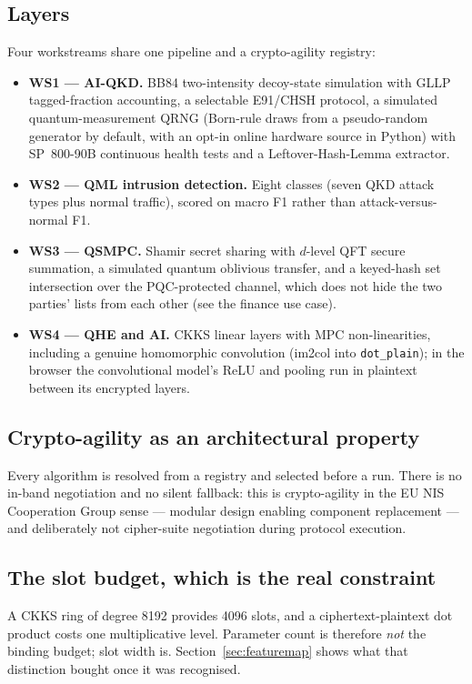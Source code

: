 \documentclass[11pt,a4paper]{article}
\begin{document}
\subsection{Layers}
Four workstreams share one pipeline and a crypto-agility registry:
\begin{itemize}
  \item \textbf{WS1 --- AI-QKD.} BB84 two-intensity decoy-state simulation with GLLP tagged-fraction
        accounting, a selectable E91/CHSH protocol, a simulated quantum-measurement QRNG
        (Born-rule draws from a pseudo-random generator by default, with an opt-in online hardware
        source in Python) with SP~800-90B continuous health tests and a Leftover-Hash-Lemma
        extractor.
  \item \textbf{WS2 --- QML intrusion detection.} Eight classes (seven QKD attack types plus normal
        traffic), scored on macro F1 rather than attack-versus-normal F1.
  \item \textbf{WS3 --- QSMPC.} Shamir secret sharing with $d$-level QFT secure summation, a
        simulated quantum oblivious transfer, and a keyed-hash set intersection over the
        PQC-protected channel, which does not hide the two parties' lists from each other (see the
        finance use case).
  \item \textbf{WS4 --- QHE and AI.} CKKS linear layers with MPC non-linearities, including a genuine
        homomorphic convolution (im2col into \texttt{dot\_plain}); in the browser the convolutional
        model's ReLU and pooling run in plaintext between its encrypted layers.
\end{itemize}

\subsection{Crypto-agility as an architectural property}
Every algorithm is resolved from a registry and selected before a run. There is no in-band
negotiation and no silent fallback: this is crypto-agility in the EU NIS Cooperation Group sense ---
modular design enabling component replacement --- and deliberately not cipher-suite negotiation
during protocol execution.



\subsection{The slot budget, which is the real constraint}
A CKKS ring of degree 8192 provides 4096 slots, and a ciphertext-plaintext dot product costs one
multiplicative level. Parameter count is therefore \emph{not} the binding budget; slot width is.
Section~\ref{sec:featuremap} shows what that distinction bought once it was recognised.
\end{document}
